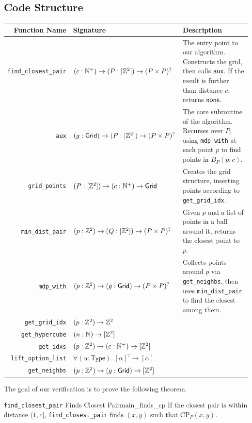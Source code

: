 \documentclass{article}
\begin{document}
\subsection{Code Structure}
\begin{center}
\begin{tabular} {|| r | l | p{5cm} ||}
  \hline
  Function Name & Signature & Description \\
  \hline
  \hline
  \texttt{find\_closest\_pair} &
  $(c : \mathbb{N}^+) \to (P : [\mathbb{Z}^2]) \to (P \times P)^?$ &
  The entry point to our algorithm.
  Constructs the grid, then calls \texttt{aux}.
  If the result is further than distance $c$, returns $\mathsf{none}$. \\
  \hline
  \texttt{aux} &
  $(g : \mathsf{Grid}) \to (P : [\mathbb{Z}^2]) \to (P \times P)^?$ &
  The core subroutine of the algorithm.
  Recurses over $P$, using \texttt{mdp\_with} at each point $p$ to find points in $B_{P}(p, c)$.
  \\
  \hline
  \texttt{grid\_points} &
  $(P : [\mathbb{Z}^2]) \to (c : \mathbb{N}^+) \to \mathsf{Grid}$ &
  Creates the grid structure, inserting points according to \texttt{get\_grid\_idx}. \\
  \hline
  \texttt{min\_dist\_pair} &
  $(p : \mathbb{Z}^2) \to (Q : [\mathbb{Z}^2]) \to (P \times P)^?$ &
  Given $p$ and a list of points in a ball around it, returns the closest point to $p$.  \\
  \hline
  \texttt{mdp\_with} &
  $(p : \mathbb{Z}^2) \to (g : \mathsf{Grid}) \to (P \times P)^?$ &
  Collects points around $p$ via \texttt{get\_neighbs}, then uses \texttt{min\_dist\_pair} to find the closest among them.
  \\
  \hline
  \texttt{get\_grid\_idx} &
  $(p : \mathbb{Z}^2) \to \mathbb{Z}^2$ &
  \\
  \hline
  \texttt{get\_hypercube} &
  $(n : \mathbb{N}) \to [\mathbb{Z}^2]$ &
  \\
  \hline
  \texttt{get\_idxs} &
  $(p : \mathbb{Z}^2) \to (c : \mathbb{N}^+) \to [\mathbb{Z}^2]$ &
  \\
  \hline
  \texttt{lift\_option\_list} &
  $\forall (\alpha : \mathsf{Type}).\, [\alpha]^? \to [\alpha]$
  &
  \\
  \hline
  \texttt{get\_neighbs} &
  $(p : \mathbb{Z}^2) \to (g : \mathsf{Grid}) \to [\mathbb{Z}^2]$ &
  \\
  \hline
\end{tabular}
\end{center}


The goal of our verification is to prove the following theorem.
\begin{tcbtheorem}{{\large\texttt{find\_closest\_pair}} Finds Closest Pair}{main_finds_cp}
If the closest pair is within distance $(1, c]$, \texttt{find\_closest\_pair} finds $(x, y)$ such that $\text{CP}_P(x, y)$.
\end{tcbtheorem}
\end{document}
